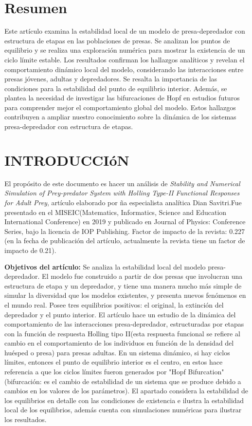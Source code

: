 \documentclass{wscpaperproc}
\theoremstyle{wsc}
\begin{document}
\section*{Resumen}
Este artículo examina la estabilidad local de un modelo de presa-depredador con estructura de etapas en
las poblaciones de presas. Se analizan los puntos de equilibrio y se realiza una exploración numérica
para mostrar la existencia de un ciclo límite estable. Los resultados confirman los hallazgos analíticos
y revelan el comportamiento dinámico local del modelo, considerando las interacciones entre presas
jóvenes, adultas y depredadores. Se resalta la importancia de las condiciones para la estabilidad
del punto de equilibrio interior. Además, se plantea la necesidad de investigar las bifurcaciones
de Hopf en estudios futuros para comprender mejor el comportamiento global del modelo. Estos hallazgos
contribuyen a ampliar nuestro conocimiento sobre la dinámica de los sistemas presa-depredador con
estructura de etapas.
\section{INTRODUCCIóN}
\label{sec:intro}
El propósito de este documento es hacer un análisis de {\it Stability and Numerical Simulation of Prey-predator System with Holling
		Type-II Functional Responses for Adult Prey}, artículo elaborado por ña especialista analítica Dian Savitri.Fue presentado en el MISEIC(Matematics,
Informatics, Science and Education International Conference) en 2019 y publicado en Journal of Physics: Conference Series, bajo la licencia de IOP Publishing.
Factor de impacto de la revista: 0.227 (en la fecha de publicación del artículo, actualmente la revista tiene un factor de impacto de 0.21).

	{\bf Objetivos del artículo:} Se analiza la estabilidad local del modelo presa-depredador. El modelo fue construido a partir de dos presas que involucran
una estructura de etapa y un depredador, y tiene una manera mucho más simple de simular la diversidad que los modelos existentes, y presenta nuevos fenómenos
en el mundo real. Posee tres equilibrios positivos: el original, la extinción del depredador y el punto interior. El artículo hace un estudio de la dinámica
del comportamiento de las interacciones presa-depredador, estructuradas por etapas con la función de respuesta Holling tipo II(esta respuesta funcional se
refiere al cambio en el comportamiento de los individuos en función de la densidad del huésped o presa) para presas adultas. En un sistema dinámico,
si hay ciclos límites, entonces el punto de equilibrio interior es el centro, en estos hace referencia a que los ciclos límites fueron generados por "Hopf Bifurcation"
(bifurcación: es el cambio de estabilidad de un sistema que se produce debido a cambios en los valores de los parámetros). El apartado considera la estabilidad de
los equilibrios en detalle con las condiciones de existencia e ilustra la estabilidad local de los equilibrios, además cuenta con simulaciones numéricas para ilustrar
los resultados.
\end{document}
